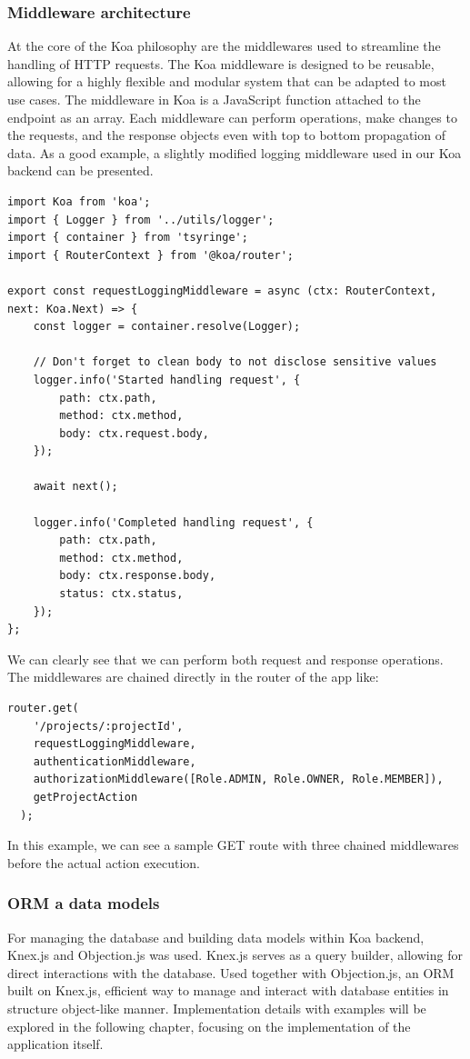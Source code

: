 \subsubsection{Middleware architecture}
At the core of the Koa philosophy are the middlewares used to streamline the handling of HTTP requests.
The Koa middleware is designed to be reusable, allowing for a highly flexible and modular system that can be adapted to most use cases.
The middleware in Koa is a JavaScript function attached to the endpoint as an array.
Each middleware can perform operations, make changes to the requests, and the response objects even with top to bottom propagation of data.
As a good example, a slightly modified logging middleware used in our Koa backend can be presented.

\medskip
\begin{lstlisting}[caption=Koa logging middleware]
import Koa from 'koa';
import { Logger } from '../utils/logger';
import { container } from 'tsyringe';
import { RouterContext } from '@koa/router';

export const requestLoggingMiddleware = async (ctx: RouterContext, next: Koa.Next) => {
	const logger = container.resolve(Logger);

	// Don't forget to clean body to not disclose sensitive values
	logger.info('Started handling request', {
		path: ctx.path,
		method: ctx.method,
		body: ctx.request.body,
	});

	await next();

	logger.info('Completed handling request', {
		path: ctx.path,
		method: ctx.method,
		body: ctx.response.body,
		status: ctx.status,
	});
};
\end{lstlisting}

We can clearly see that we can perform both request and response operations. The middlewares are chained directly in the router of the app like:

\medskip
\begin{lstlisting}[caption=Koa router example]
  router.get(
    '/projects/:projectId',
    requestLoggingMiddleware,
    authenticationMiddleware,
    authorizationMiddleware([Role.ADMIN, Role.OWNER, Role.MEMBER]),
    getProjectAction
  );
\end{lstlisting}

In this example, we can see a sample GET route with three chained middlewares before the actual action execution.


\subsubsection{ORM a data models}
For managing the database and building data models within Koa backend, Knex.js and Objection.js was used.
Knex.js serves as a query builder, allowing for direct interactions with the database.
Used together with Objection.js, an \ac{ORM} built on Knex.js, efficient way to manage and interact with database entities in structure object-like manner.
Implementation details with examples will be explored in the following chapter, focusing on the implementation of the application itself.


